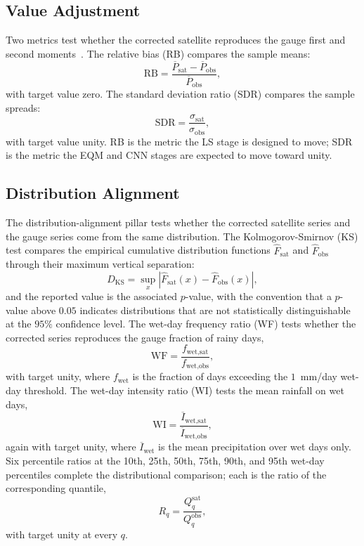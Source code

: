 \subsection{Value Adjustment}

Two metrics test whether the corrected satellite reproduces the
gauge first and second moments~\citep{ref:wilks2020}. The relative bias (RB) compares the
sample means:
\begin{equation}
\text{RB} = \frac{\overline{P}_{\text{sat}} - \overline{P}_{\text{obs}}}{\overline{P}_{\text{obs}}},
\label{eq:rb}
\end{equation}
with target value zero. The standard deviation ratio (SDR)
compares the sample spreads:
\begin{equation}
\text{SDR} = \frac{\sigma_{\text{sat}}}{\sigma_{\text{obs}}},
\label{eq:sdr}
\end{equation}
with target value unity. RB is the metric the LS stage is
designed to move; SDR is the metric the EQM and CNN stages are
expected to move toward unity.

\subsection{Distribution Alignment}

The distribution-alignment pillar tests whether the corrected
satellite series and the gauge series come from the same
distribution. The Kolmogorov-Smirnov (KS) test
\citep{ref:wilks2020} compares the empirical cumulative
distribution functions $\hat{F}_{\text{sat}}$ and
$\hat{F}_{\text{obs}}$ through their maximum vertical separation:
\begin{equation}
D_{\text{KS}} = \sup_{x}
\left| \hat{F}_{\text{sat}}(x) - \hat{F}_{\text{obs}}(x) \right|,
\label{eq:ks}
\end{equation}
and the reported value is the associated $p$-value, with the
convention that a $p$-value above $0.05$ indicates distributions
that are not statistically distinguishable at the $95\%$
confidence level. The wet-day frequency ratio (WF) tests whether
the corrected series reproduces the gauge fraction of rainy days,
\begin{equation}
\text{WF} = \frac{f_{\text{wet,sat}}}{f_{\text{wet,obs}}},
\label{eq:wetfreq}
\end{equation}
with target unity, where $f_{\text{wet}}$ is the fraction of days
exceeding the $1$~mm/day wet-day threshold. The wet-day intensity
ratio (WI) tests the mean rainfall on wet days,
\begin{equation}
\text{WI} = \frac{\overline{I}_{\text{wet,sat}}}
                 {\overline{I}_{\text{wet,obs}}},
\label{eq:wetint}
\end{equation}
again with target unity, where $\overline{I}_{\text{wet}}$ is the
mean precipitation over wet days only. Six percentile ratios at
the 10th, 25th, 50th, 75th, 90th, and 95th wet-day percentiles
complete the distributional comparison; each is the ratio of the
corresponding quantile,
\begin{equation}
R_q = \frac{Q_q^{\text{sat}}}{Q_q^{\text{obs}}},
\label{eq:pctlratio}
\end{equation}
with target unity at every $q$.

